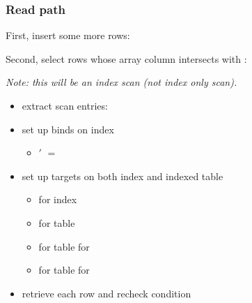 \begin{frame}
  \frametitle{Read path}
  First, insert some more rows:


  \pause

  Second, select rows whose array column intersects with :

  \pause

  \emph{Note: this will be an index scan (not index only scan).}
  \pause

  \begin{itemize}
    \item extract scan entries: 
      \pause
    \item set up binds on index
      \begin{itemize}
        \item {}$'$ $=$ 
      \end{itemize}
      \pause
    \item set up targets on both index and indexed table
      \begin{itemize}
        \item {} for index
          \pause
        \item {} for table
          \pause
        \item {} for table for 
          \pause
        \item {} for table for 
      \end{itemize}
      \pause
    \item retrieve each row and recheck condition
  \end{itemize}
\end{frame}

